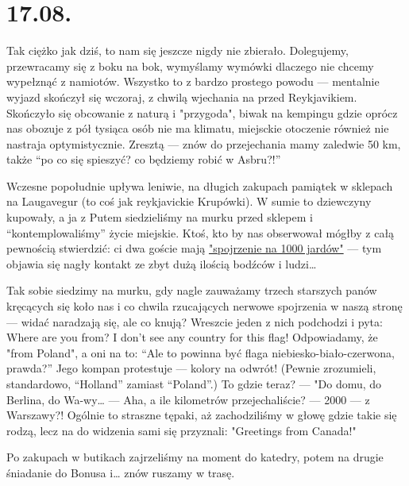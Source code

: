 \chapter*{17.08.}

Tak ciężko jak dziś, to nam się jeszcze nigdy nie zbierało. Dolegujemy, przewracamy się z boku na bok, wymyślamy wymówki dlaczego nie chcemy wypełznąć z namiotów. Wszystko to z bardzo prostego powodu --- mentalnie wyjazd skończył się wczoraj, z chwilą wjechania na  przed Reykjavikiem. Skończyło się obcowanie z naturą i "przygoda", biwak na kempingu gdzie oprócz nas obozuje z pół tysiąca osób nie ma klimatu, miejsckie otoczenie również nie nastraja optymistycznie. Zresztą --- znów do przejechania mamy zaledwie 50 km, także “po co się spieszyć? co będziemy robić w Asbru?!”

Wczesne popołudnie upływa leniwie, na długich zakupach pamiątek w sklepach na Laugavegur (to coś jak reykjavickie Krupówki). W sumie to dziewczyny kupowały, a ja z Putem siedzieliśmy na murku przed sklepem i “kontemplowaliśmy” życie miejskie. Ktoś, kto by nas obserwował mógłby z całą pewnością stwierdzić: ci dwa goście mają \href{http://en.wikipedia.org/wiki/Thousand-yard_stare}{"spojrzenie na 1000 jardów"} --- tym objawia się nagły kontakt ze zbyt dużą ilością bodźców i ludzi…


Tak sobie siedzimy na murku, gdy nagle zauważamy trzech starszych panów kręcących się koło nas i co chwila rzucających nerwowe spojrzenia w naszą stronę --- widać naradzają się, ale co knują? Wreszcie jeden z nich podchodzi i pyta: Where are you from? I don’t see any country for this flag! Odpowiadamy, że "from Poland", a oni na to: “Ale to powinna być flaga niebiesko-biało-czerwona, prawda?” Jego kompan protestuje --- kolory na odwrót! (Pewnie zrozumieli, standardowo, “Holland” zamiast “Poland”.) To gdzie teraz? --- "Do domu, do Berlina, do Wa-wy… --- Aha, a ile kilometrów przejechaliście? --- 2000 --- z Warszawy?! Ogólnie to straszne tępaki, aż zachodziliśmy w głowę gdzie takie się rodzą, lecz na do widzenia sami się przyznali: "Greetings from Canada!"

Po zakupach w butikach zajrzeliśmy na moment do katedry, potem na drugie śniadanie do Bonusa i… znów ruszamy w trasę.

